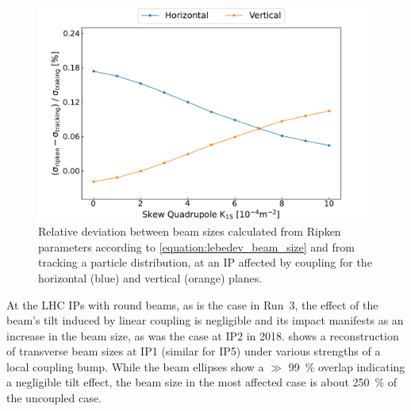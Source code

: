 \begin{figure}[!htb]
    \centering
    \includegraphics*[width=\textwidth]{Figures/IR_Coupling_Correction/lebedev_vs_tracking.pdf}
    \caption{Relative deviation between beam sizes calculated from Ripken parameters according to \cref{equation:lebedev_beam_size} and from tracking a particle distribution, at an IP affected by coupling for the horizontal (\textcolor{mplblue}{blue}) and vertical (\textcolor{mplorange}{orange}) planes.}
    \label{figure:lebedev_vs_tracking}
\end{figure}

At the LHC IPs with round beams, as is the case in Run~\num{3}, the effect of the beam's tilt induced by linear coupling is negligible and its impact manifests as an increase in the beam size, as was the case at IP\num{2} in \num{2018}.
 shows a reconstruction of transverse beam sizes at IP\num{1} (similar for IP\num{5}) under various strengths of a local coupling bump.
While the beam ellipses show a \(\gg\) \qty{99}{\percent} overlap indicating a negligible tilt effect, the beam size in the most affected case is about \qty{250}{\percent} of the uncoupled case.

